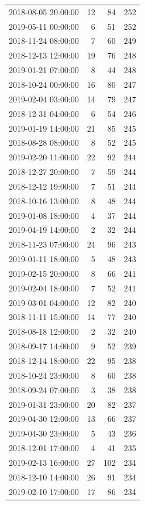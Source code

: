 \begin{tabular}{lrrr}
2018-08-05 20:00:00 & 12 & 84 & 252 \\
2019-05-11 00:00:00 & 6 & 51 & 252 \\
2018-11-24 08:00:00 & 7 & 60 & 249 \\
2018-12-13 12:00:00 & 19 & 76 & 248 \\
2019-01-21 07:00:00 & 8 & 44 & 248 \\
2018-10-24 00:00:00 & 16 & 80 & 247 \\
2019-02-04 03:00:00 & 14 & 79 & 247 \\
2018-12-31 04:00:00 & 6 & 54 & 246 \\
2019-01-19 14:00:00 & 21 & 85 & 245 \\
2018-08-28 08:00:00 & 8 & 52 & 245 \\
2019-02-20 11:00:00 & 22 & 92 & 244 \\
2018-12-27 20:00:00 & 7 & 59 & 244 \\
2018-12-12 19:00:00 & 7 & 51 & 244 \\
2018-10-16 13:00:00 & 8 & 48 & 244 \\
2019-01-08 18:00:00 & 4 & 37 & 244 \\
2019-04-19 14:00:00 & 2 & 32 & 244 \\
2018-11-23 07:00:00 & 24 & 96 & 243 \\
2019-01-11 18:00:00 & 5 & 48 & 243 \\
2019-02-15 20:00:00 & 8 & 66 & 241 \\
2019-02-04 18:00:00 & 7 & 52 & 241 \\
2019-03-01 04:00:00 & 12 & 82 & 240 \\
2018-11-11 15:00:00 & 14 & 77 & 240 \\
2018-08-18 12:00:00 & 2 & 32 & 240 \\
2018-09-17 14:00:00 & 9 & 52 & 239 \\
2018-12-14 18:00:00 & 22 & 95 & 238 \\
2018-10-24 23:00:00 & 8 & 60 & 238 \\
2018-09-24 07:00:00 & 3 & 38 & 238 \\
2019-01-31 23:00:00 & 20 & 82 & 237 \\
2019-04-30 12:00:00 & 13 & 66 & 237 \\
2019-04-30 23:00:00 & 5 & 43 & 236 \\
2018-12-01 17:00:00 & 4 & 41 & 235 \\
2019-02-13 16:00:00 & 27 & 102 & 234 \\
2018-12-10 14:00:00 & 26 & 91 & 234 \\
2019-02-10 17:00:00 & 17 & 86 & 234 \\

\end{tabular}
